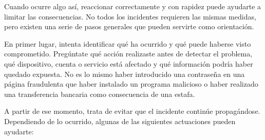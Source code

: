 \documentclass[
  spanish,
  a4paper,
  openany]{book}
\begin{document}
Cuando ocurre algo así, reaccionar correctamente y con rapidez puede ayudarte a limitar las consecuencias. No todos los incidentes requieren las mismas medidas, pero existen una serie de pasos generales que pueden servirte como orientación.

En primer lugar, intenta identificar qué ha ocurrido y qué puede haberse visto comprometido. Pregúntate qué acción realizaste antes de detectar el problema, qué dispositivo, cuenta o servicio está afectado y qué información podría haber quedado expuesta. No es lo mismo haber introducido una contraseña en una página fraudulenta que haber instalado un programa malicioso o haber realizado una transferencia bancaria como consecuencia de una estafa.

A partir de ese momento, trata de evitar que el incidente continúe propagándose. Dependiendo de lo ocurrido, algunas de las siguientes actuaciones pueden ayudarte:
\end{document}
